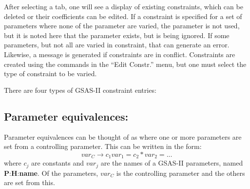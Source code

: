 After selecting a tab, one will see a display of existing constraints, which can be deleted or their coefficients can be edited. If a constraint is specified for a set of parameters where none of the parameter are varied, the parameter is not used, but it is noted here that the parameter exists, but is being ignored. If some parameters, but not all are varied in constraint, that can generate an error. Likewise, a message is generated if constraints are in conflict. Constraints are created using the commands in the ``Edit Constr.'' menu, but one must select the type of constraint to be varied. 

There are four types of GSAS-II constraint entries:

\subsection{Parameter equivalences:}
Parameter equivalences can be thought of as where one or more parameters are set from a controlling parameter. This can be written in the form:
$$var_C \rightarrow  c_1 var _1 = c_2 * var_2 = ...$$
where $c_j$ are constants and $var_j$ are the names of a GSAS-II parameters, named \textbf{P}:\textbf{H}:\textbf{name}. Of the parameters, $var_C$ is the controlling parameter and the others are set from this. 

